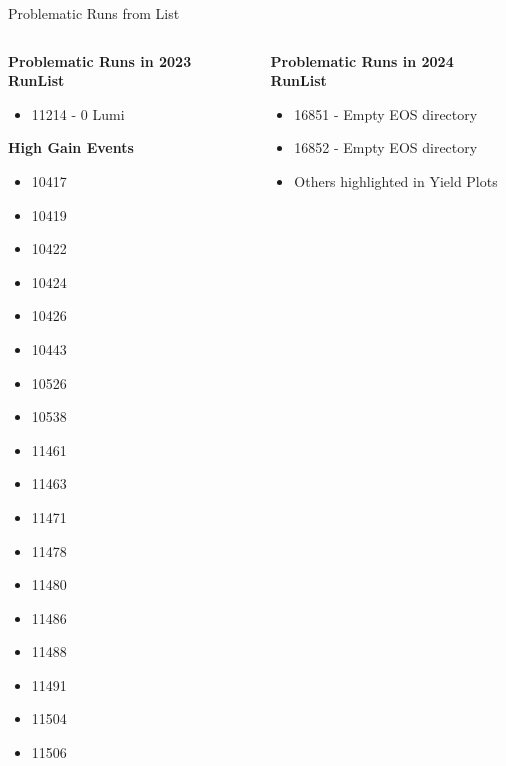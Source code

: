 \begin{frame}{Problematic Runs from List}
    \begin{columns}
        \begin{column}{0.5 \linewidth}
            \scriptsize \textbf{Problematic Runs in 2023 RunList}
            \begin{itemize}
                \setlength\itemsep{-0.1em}
                \scriptsize
                \item 11214 - 0 Lumi
            \end{itemize}
            \textbf{High Gain Events}
            \begin{itemize}
                \setlength\itemsep{-0.05em}
                \scriptsize
                \item 10417 
                \item 10419 
                \item 10422 
                \item 10424 
                \item 10426 
                \item 10443 
                \item 10526 
                \item 10538 
                \item 11461 
                \item 11463 
                \item 11471 
                \item 11478 
                \item 11480 
                \item 11486 
                \item 11488 
                \item 11491 
                \item 11504 
                \item 11506 
            \end{itemize}
        \end{column}
        \begin{column}{0.5\linewidth}
            \scriptsize \textbf{Problematic Runs in 2024 RunList}
            \begin{itemize}
                \scriptsize
                \item 16851 - Empty EOS directory
                \item 16852 - Empty EOS directory
                \item Others highlighted in Yield Plots
            \end{itemize}
        \end{column}
    \end{columns}
\end{frame}


